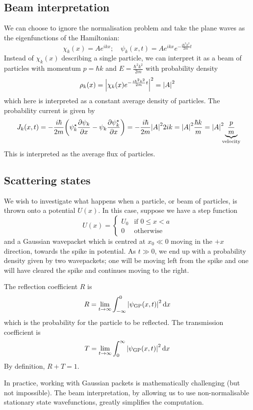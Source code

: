 \subsection{Beam interpretation}
We can choose to ignore the normalisation problem and take the plane waves as the eigenfunctions of the Hamiltonian:
\[
	\chi_k(x) = Ae^{ikx};\quad \psi_k(x,t) = Ae^{ikx}e^{-\frac{i \hbar^2 k^2}{2m} t}
\]
Instead of \( \chi_k(x) \) describing a single particle, we can interpret it as a beam of particles with momentum \( p = \hbar k \) and \( E = \frac{\hbar^2 k^2}{2m} \) with probability density
\[
	\rho_k(x) = \abs{\chi_k(x) e^{-\frac{i\hbar^2 k^2}{2m}t}}^2 = \abs{A}^2
\]
which here is interpreted as a constant average density of particles.
The probability current is given by
\[
	J_k(x,t) = - \frac{i\hbar}{2m} \qty(\psi^\star_k \pdv{\psi_k}{x} - \psi_k \pdv{\psi_k^\star}{x}) = -\frac{i\hbar}{2m} \abs{A}^2 2ik = \abs{A}^2 \frac{\hbar k}{m} = \abs{A}^2 \underbrace{\frac{p}{m}}_{\mathclap{\text{velocity}}}
\]
This is interpreted as the average flux of particles.

\subsection{Scattering states}
We wish to investigate what happens when a particle, or beam of particles, is thrown onto a potential \( U(x) \).
In this case, suppose we have a step function
\[
	U(x) = \begin{cases} U_0 & \text{if } 0 \leq x < a \\
              0   & \text{otherwise}\end{cases}
\]
and a Gaussian wavepacket which is centred at \( x_0 \ll 0 \) moving in the \( +x \) direction, towards the spike in potential.
As \( t \gg 0 \), we end up with a probability density given by two wavepackets; one will be moving left from the spike and one will have cleared the spike and continues moving to the right.
\begin{definition}
	The reflection coefficient \( R \) is
	\[
		R = \lim_{t \to \infty} \int_{-\infty}^0 \abs{\psi_{\text{GP}}(x,t)}^2 \dd{x}
	\]
	which is the probability for the particle to be reflected.
	The transmission coefficient is
	\[
		T = \lim_{t \to \infty} \int_0^\infty \abs{\psi_{\text{GP}}(x,t)}^2 \dd{x}
	\]
	By definition, \( R + T = 1 \).
\end{definition}
In practice, working with Gaussian packets is mathematically challenging (but not impossible).
The beam interpretation, by allowing us to use non-normalisable stationary state wavefunctions, greatly simplifies the computation.

